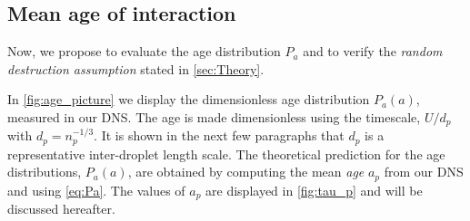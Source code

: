 
\subsection{Mean age of interaction}

Now, we propose to evaluate the age distribution $P_a$ and to verify the \textit{random destruction assumption} stated in \ref{sec:Theory}. 

In \ref{fig:age_picture} we display the dimensionless age distribution $P_a(a)$, measured in our DNS. 
The age is made dimensionless using the timescale, $U/d_p$ with $d_p = n_p^{-1/3}$.
It is shown in the next few paragraphs that $d_p$ is a representative inter-droplet length scale. 
The theoretical prediction for the age distributions, $P_a(a)$, are obtained by computing the mean \textit{age} $a_p$ from our DNS and using \ref{eq:Pa}. 
The values of $a_p$ are displayed in \ref{fig:tau_p} and will be discussed hereafter. 

